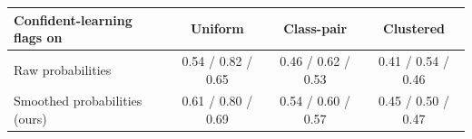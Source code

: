 \begin{tabular}{l ccc}
\toprule
Confident-learning flags on & Uniform & Class-pair & Clustered \\
\midrule
Raw probabilities & 0.54 / 0.82 / 0.65 & 0.46 / 0.62 / 0.53 & 0.41 / 0.54 / 0.46 \\
Smoothed probabilities (ours) & 0.61 / 0.80 / 0.69 & 0.54 / 0.60 / 0.57 & 0.45 / 0.50 / 0.47 \\
\bottomrule
\end{tabular}